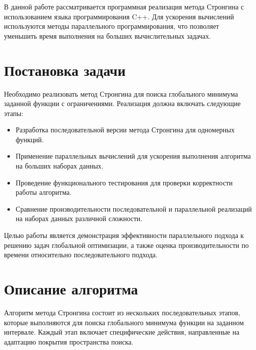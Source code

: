 \documentclass[a4paper,12pt]{article}
\begin{document}
В данной работе рассматривается программная реализация метода Стронгина с использованием языка программирования C++. Для ускорения вычислений используются методы параллельного программирования, что позволяет уменьшить время выполнения на больших вычислительных задачах.

\section{Постановка задачи}

\hspace*{1.25em}Необходимо реализовать метод Стронгина для поиска глобального минимума заданной функции с ограничениями. Реализация должна включать следующие этапы:

\begin{itemize}
    \item Разработка последовательной версии метода Стронгина для одномерных функций.
    \item Применение параллельных вычислений для ускорения выполнения алгоритма на больших наборах данных.
    \item Проведение функционального тестирования для проверки корректности работы алгоритма.
    \item Сравнение производительности последовательной и параллельной реализаций на наборах данных различной сложности.
\end{itemize}

Целью работы является демонстрация эффективности параллельного подхода к решению задач глобальной оптимизации, а также оценка производительности по времени относительно последовательного подхода.

\section{Описание алгоритма}

\hspace*{1.25em}Алгоритм метода Стронгина состоит из нескольких последовательных этапов, которые выполняются для поиска глобального минимума функции на заданном интервале. Каждый этап включает специфические действия, направленные на адаптацию покрытия пространства поиска.
\end{document}
